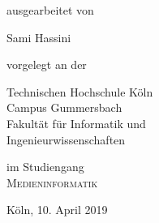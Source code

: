 \documentclass[a4paper, 12pt]{scrartcl}
\begin{document}
\begin{titlepage}
\begin{center}
		\begin{large}
			ausgearbeitet von\\ 
			\vspace{0.2cm}
			\begin{LARGE}
				Sami Hassini\\
			\end{LARGE}
		\end{large}
		
		\vspace{1.0cm}
		
		
		\begin{large}
			vorgelegt an der\\ 
			\vspace{0.2cm}
			\begin{scshape}
				Technischen Hochschule Köln\\
				Campus Gummersbach\\
				Fakultät für Informatik und\\
				Ingenieurwissenschaften\\
			\end{scshape}
		\end{large}
		
		\vspace{0.4cm}
		
		\begin{large}
			im Studiengang\\ 
			\vspace{0.2cm}
			\textsc{Medieninformatik}
		\end{large}
		
		
		\vspace{1.0cm}
		
	
		
		\begin{large}
			Köln, 10. April 2019
		\end{large}
		
	\end{center}

\end{titlepage}
	
	\newpage
	\thispagestyle{empty}
	
	

	
\end{document}
